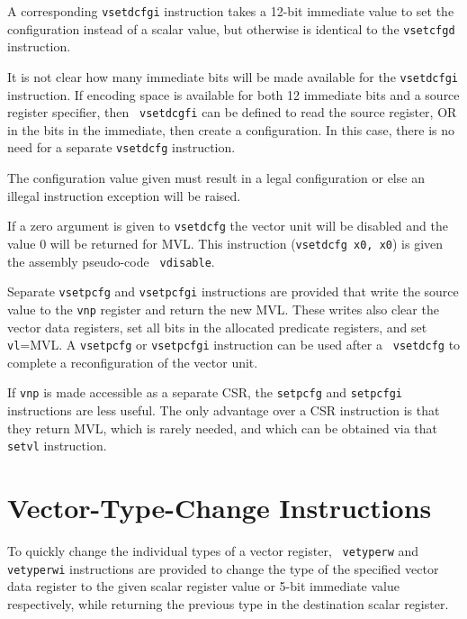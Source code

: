 A corresponding {\tt vsetdcfgi} instruction takes a 12-bit immediate
value to set the configuration instead of a scalar value, but
otherwise is identical to the {\tt vsetcfgd} instruction.

\begin{discussion}
It is not clear how many immediate bits will be made available for the
{\tt vsetdcfgi} instruction.  If encoding space is available for both
12 immediate bits and a source register specifier, then {\tt
  vsetdcgfi} can be defined to read the source register, OR in the
bits in the immediate, then create a configuration.  In this case,
there is no need for a separate {\tt vsetdcfg} instruction.
\end{discussion}

The configuration value given must result in a legal configuration or
else an illegal instruction exception will be raised.

If a zero argument is given to {\tt vsetdcfg} the vector unit will be
disabled and the value 0 will be returned for MVL.  This instruction
({\tt vsetdcfg x0, x0}) is given the assembly pseudo-code {\tt
  vdisable}.

Separate {\tt vsetpcfg} and {\tt vsetpcfgi} instructions are provided
that write the source value to the {\tt vnp} register and return the
new MVL.  These writes also clear the vector data registers, set all
bits in the allocated predicate registers, and set {\tt vl}=MVL. A
{\tt vsetpcfg} or {\tt vsetpcfgi} instruction can be used after a {\tt
  vsetdcfg} to complete a reconfiguration of the vector unit.

\begin{discussion}
  If {\tt vnp} is made accessible as a separate CSR, the {\tt setpcfg}
  and {\tt setpcfgi} instructions are less useful.  The only advantage
  over a CSR instruction is that they return MVL, which is rarely
  needed, and which can be obtained via that {\tt setvl} instruction.
\end{discussion}

\section{Vector-Type-Change Instructions}

To quickly change the individual types of a vector register, {\tt
  vetyperw} and {\tt vetyperwi} instructions are provided to change
the type of the specified vector data register to the given scalar
register value or 5-bit immediate value respectively, while returning
the previous type in the destination scalar register.

